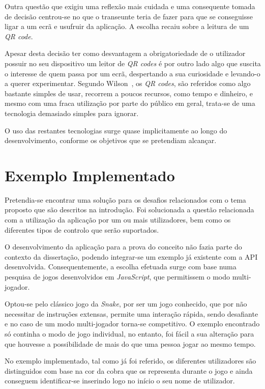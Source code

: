 Outra questão que exigiu uma reflexão mais cuidada e uma consequente tomada de decisão centrou-se no que o transeunte teria de fazer para que se conseguisse ligar a um ecrã e usufruir da aplicação. A escolha recaiu sobre a leitura de um \textit{QR code}. 

Apesar desta decisão ter como desvantagem a obrigatoriedade de o utilizador possuir no seu dispositivo um leitor de \textit{QR codes} é por outro lado algo que suscita o interesse de quem passa por um ecrã, despertando a sua curiosidade e levando-o a querer experimentar. Segundo Wilson~\cite{Wilson2014}, os \textit{QR codes}, são referidos como algo bastante simples de usar, recorrem a poucos recursos, como tempo e dinheiro, e mesmo com uma fraca utilização por parte do público em geral, trata-se de uma tecnologia demasiado simples para ignorar.

O uso das restantes tecnologias surge quase implicitamente ao longo do desenvolvimento, conforme os objetivos que se pretendiam alcançar.

\section{Exemplo Implementado}

Pretendia-se encontrar uma solução para os desafios relacionados com o tema proposto que são descritos na introdução. Foi solucionada a questão relacionada com a utilização da aplicação por um ou mais utilizadores, bem como os diferentes tipos de controlo que serão suportados.

O desenvolvimento da aplicação para a prova do conceito não fazia parte do contexto da dissertação, podendo integrar-se um exemplo já existente com a API desenvolvida. Consequentemente, a escolha efetuada surge com base numa pesquisa de jogos desenvolvidos em \textit{JavaScript}, que permitissem o modo multi-jogador. 

Optou-se pelo clássico jogo da \textit{Snake}, por ser um jogo conhecido, que por não necessitar de instruções extensas, permite uma interação rápida, sendo desafiante e no caso de um modo multi-jogador torna-se competitivo. O exemplo encontrado só continha o modo de jogo individual, no entanto, foi fácil a sua alteração para que houvesse a possibilidade de mais do que uma pessoa jogar ao mesmo tempo.

No exemplo implementado, tal como já foi referido, os diferentes utilizadores são distinguidos com base na cor da cobra que os representa durante o jogo e ainda conseguem identificar-se inserindo logo no início o seu nome de utilizador. 

